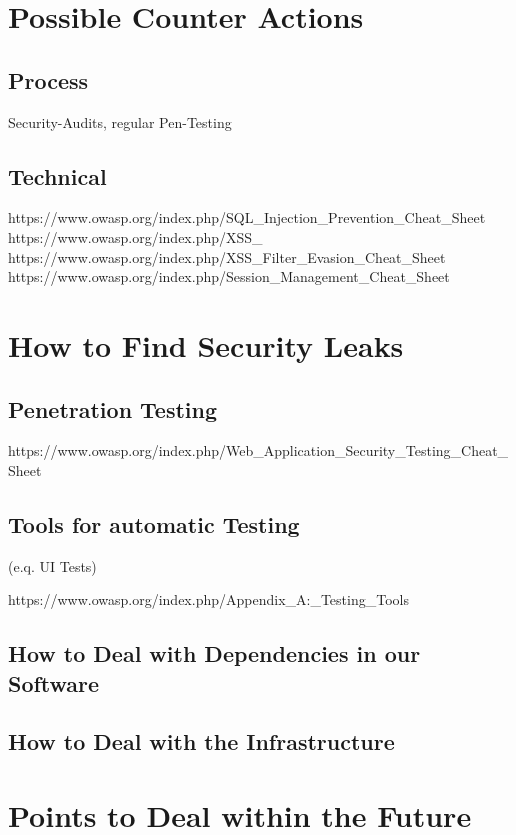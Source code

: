 \section{Possible Counter Actions}

\subsection{Process}
Security-Audits, regular Pen-Testing

\subsection{Technical}
https://www.owasp.org/index.php/SQL_Injection_Prevention_Cheat_Sheet
https://www.owasp.org/index.php/XSS_%
https://www.owasp.org/index.php/XSS_Filter_Evasion_Cheat_Sheet
https://www.owasp.org/index.php/Session_Management_Cheat_Sheet

\section{How to Find Security Leaks}


\subsection{Penetration Testing}

https://www.owasp.org/index.php/Web_Application_Security_Testing_Cheat_Sheet

\subsection{Tools for automatic Testing}
(e.q. UI Tests)

https://www.owasp.org/index.php/Appendix_A:_Testing_Tools

\subsection{How to Deal with Dependencies in our Software}
\subsection{How to Deal with the Infrastructure}
\section{Points to Deal within the Future}

